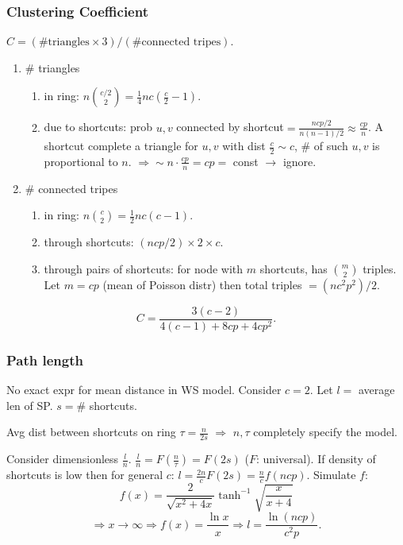 \documentclass[a4paper,twocolumn,10pt]{article}
\newcommand{\op}{\operatorname}
\begin{document}
	\subsubsection{Clustering Coefficient}
		$C=(\#\textrm{triangles}\times 3)/(\#\textrm{connected tripes})$.
		\begin{enumerate}
			\item $\#$ triangles
			\begin{enumerate}
				\item in ring: $n\binom{c/2}{2}=\frac{1}{4}nc(\frac{c}{2} - 1)$.
				\item due to shortcuts:
					prob $u,v$ connected by shortcut$=\frac{ncp/2}{n(n-1)/2}\approx \frac{cp}{n}$.
					A shortcut complete a triangle for $u,v$ with dist $\frac{c}{2}\sim c$,
						$\#$ of such $u,v$ is proportional to $n$.
					$\Longrightarrow \sim n\cdot \frac{cp}{n} = cp =$
					const $\to$ ignore.
					
			\end{enumerate}
			\item $\#$ connected tripes
			\begin{enumerate}
				\item in ring: $n\binom{c}{2}=\frac{1}{2}nc(c - 1)$.
				\item through shortcuts: $(ncp/2)\times 2\times c$.
				\item through pairs of shortcuts: for node with $m$ shortcuts,
					has $\binom{m}{2}$ triples.
					Let $m=cp$ (mean of Poisson distr) then total triples
					$=(nc^2p^2)/2$.
			\end{enumerate}
		\end{enumerate}
		\[
			C=\frac{3(c-2)}{4(c-1)+8cp+4cp^2}.
		\]
	
	\subsubsection{Path length}
		No exact expr for mean distance in WS model.
		Consider $c=2$. Let $l=$ average len of SP.
		$s=\#$ shortcuts.

		Avg dist between shortcuts on ring $\tau=\frac{n}{2s}$
			$\Longrightarrow$ $n,\tau$ completely specify the model.

		Consider dimensionless $\frac{l}{n}$.
		$\frac{l}{n}=F(\frac{n}{\tau})=F(2s)$
		($F$: universal).
		If density of shortcuts is low then for general $c$:
		$l=\frac{2n}{c} F(2s) = \frac{n}{c} f(ncp)$.
		Simulate $f$:
		\[
			f(x) = \frac{2}{\sqrt{x^2+4x}}\op{tanh}^{-1}\sqrt{\frac{x}{x+4}}
		\]
		\[
			\Rightarrow x\to\infty
			\Rightarrow f(x) = \frac{\ln x}{x}
			\Rightarrow l = \frac{\ln(ncp)}{c^2p}.
		\]
\end{document}
